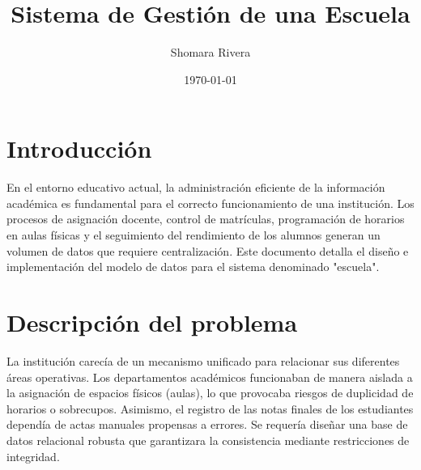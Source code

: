 \documentclass[10pt,letterpaper]{article}
\title{Sistema de Gestión de una Escuela}
\author{Shomara Rivera}
\date{\today}
\begin{document}
\maketitle
\tableofcontents
\lstlistoflistings

\section{Introducción}
En el entorno educativo actual, la administración eficiente de la información académica es fundamental para el correcto funcionamiento de una institución. Los procesos de asignación docente, control de matrículas, programación de horarios en aulas físicas y el seguimiento del rendimiento de los alumnos generan un volumen de datos que requiere centralización. Este documento detalla el diseño e implementación del modelo de datos para el sistema denominado "escuela".

\section{Descripción del problema}
La institución carecía de un mecanismo unificado para relacionar sus diferentes áreas operativas. Los departamentos académicos funcionaban de manera aislada a la asignación de espacios físicos (aulas), lo que provocaba riesgos de duplicidad de horarios o sobrecupos. Asimismo, el registro de las notas finales de los estudiantes dependía de actas manuales propensas a errores. Se requería diseñar una base de datos relacional robusta que garantizara la consistencia mediante restricciones de integridad.
\end{document}
